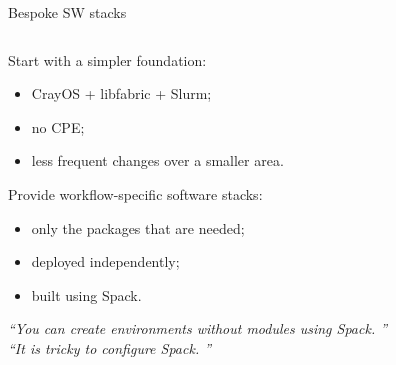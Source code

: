 \documentclass[aspectratio=43]{beamer}
\begin{document}

\begin{frame}[fragile]{Bespoke SW stacks}
    \begin{columns}[T]
        \begin{column}{0.6\textwidth}
            Start with a simpler foundation:
            \begin{itemize}
                \item CrayOS + libfabric + Slurm;
                \item no CPE;
                \item less frequent changes over a smaller area.
            \end{itemize}

            Provide workflow-specific software stacks:
            \begin{itemize}
                \item only the packages that are needed;
                \item deployed independently;
                \item built using Spack.
            \end{itemize}

            \begin{center}
            \emph{``You can create environments without modules using Spack. ''}\\
            \emph{``It is tricky to configure Spack. ''}
            \end{center}



\end{column}
\end{columns}
\end{frame}
\end{document}
